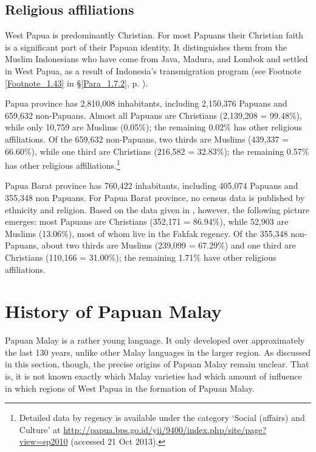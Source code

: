 {\subsection{Religious affiliations}\label{Para_1.7.4}
West Papua is predominantly Christian. For most Papuans their Christian faith is a significant part of their Papuan identity. It distinguishes them from the Muslim Indonesians who have come from Java, Madura, and Lombok and settled in West Papua, as a result of Indonesia’s transmigration program (see Footnote \ref{Footnote_1.43} in §\ref{Para_1.7.2}, p. \pageref{Footnote_1.43}).


Papua province has 2,810,008 inhabitants, including 2,150,376 Papuans and 659,632 non-Papuans. Almost all Papuans are Christians (2,139,208 = 99.48\%), while only 10,759 are Muslims (0.05\%); the remaining 0.02\% has other religious affiliations. Of the 659,632 non-Papuans, two thirds are Muslims (439,337 = 66.60\%), while one third are Christians (216,582 = 32.83\%); the remaining 0.57\% has other religious affiliations.\footnote{Detailed data by regency is available under the category  ‘Social (affairs) and Culture’ at \url{http://papua.bps.go.id/yii/9400/index.php/site/page?view=sp2010} (accessed 21 Oct 2013).}



Papua Barat province has 760,422 inhabitants, including 405,074 Papuans and 355,348 non Papuans. For Papua Barat province, no census data is published by ethnicity and religion. Based on the data given in \citet[11–14]{BidangNeracaWilayahdanAnalisisStatistik.2011}, however, the following picture emerges: most Papuans are Christians (352,171 = 86.94\%), while 52,903 are Muslims (13.06\%), most of whom live in the Fakfak regency. Of the 355,348 non-Papuans, about two thirds are Muslims (239,099 = 67.29\%) and one third are Christians (110,166 = 31.00\%); the remaining 1.71\% have other religious affiliations.


\section{History of Papuan Malay}\label{Para_1.8}
Papuan Malay is a rather young language. It only developed over approximately the last 130 years, unlike other Malay languages in the larger region. As discussed in this section, though, the precise origins of Papuan Malay remain unclear. That is, it is not known exactly which Malay varieties had which amount of influence in which regions of West Papua in the formation of Papuan Malay.



}
